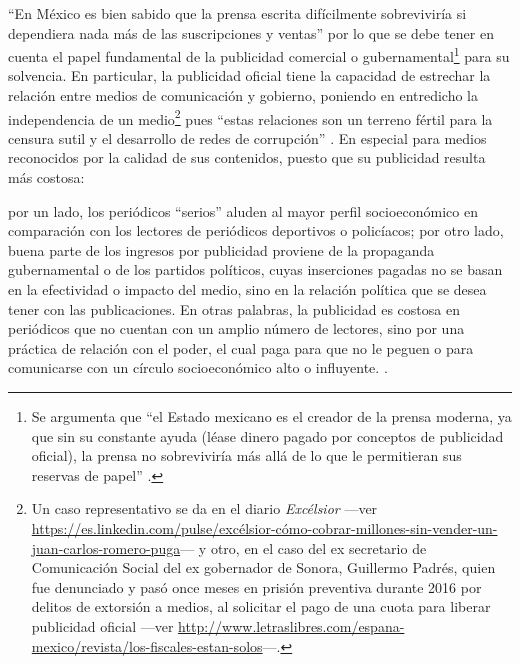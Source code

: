 \documentclass[letterpaper, 11pt]{book}
\theoremstyle{definition}
\theoremstyle{remark}
\begin{document}
``En México es bien sabido que la prensa escrita difícilmente sobreviviría si dependiera nada más de las suscripciones y ventas'' \citep[227]{2011_Tesis_LaJornada} por lo que se debe tener en cuenta el papel fundamental de la publicidad comercial o gubernamental\footnote{
Se argumenta que ``el Estado mexicano es el creador de la prensa moderna, ya que sin su constante ayuda (léase dinero pagado por conceptos de publicidad oficial), la prensa no sobreviviría más allá de lo que le permitieran sus reservas de papel'' \citep[228]{2011_Tesis_LaJornada}.} para su solvencia. En particular, la publicidad oficial tiene la capacidad de estrechar la relación entre medios de comunicación y gobierno, poniendo en entredicho la independencia de un medio\footnote{
Un caso representativo se da en el diario \emph{Excélsior} ---ver \url{https://es.linkedin.com/pulse/excélsior-cómo-cobrar-millones-sin-vender-un-juan-carlos-romero-puga}--- y otro, en el caso del ex secretario de Comunicación Social del ex gobernador de	Sonora, Guillermo Padrés, quien fue denunciado y pasó once meses en prisión preventiva durante 2016 por delitos de extorsión a medios, al solicitar el pago de una cuota para liberar publicidad oficial ---ver \url{http://www.letraslibres.com/espana-mexico/revista/los-fiscales-estan-solos}---.} pues ``estas relaciones son un terreno fértil para la censura sutil y el desarrollo de redes de corrupción'' \citep[6]{2017_FUNDAR_PublicidadOficial}. 
En especial para medios reconocidos por la calidad de sus contenidos, puesto que su publicidad resulta más costosa:

\begin{center}
    \begin{minipage}{0.9\linewidth}
        {\setlength{\parindent}{12pt}\small
         por un lado, los periódicos ``serios'' aluden al mayor perfil socioeconómico en comparación con los lectores de periódicos deportivos o policíacos; por otro lado, buena parte de los ingresos por publicidad proviene de la propaganda gubernamental o de los partidos políticos, cuyas inserciones pagadas no se basan en la efectividad o impacto del medio, sino en la relación política que se desea tener con las publicaciones. 
         En otras palabras, la publicidad es costosa en periódicos que no cuentan con un amplio número de lectores, sino por una práctica de relación con el poder, el cual paga para que no le peguen o para comunicarse con un círculo socioeconómico alto o influyente. \normalsize \citep[133--134]{2013_HuertaGomez_ConcentracionMedios}.
        }
    \end{minipage}
\end{center}
\end{document}
